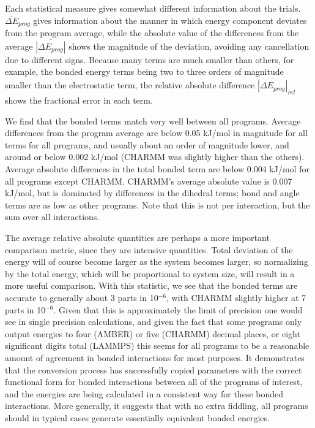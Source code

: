 Each statistical measure gives somewhat different information about
the trials. $\overline{\Delta E}_{prog}$ gives information about the manner
in which energy component deviates from the program average, while the
absolute value of the differences from the average $\overline{\left|\Delta E_{prog}\right|}$ 
shows the magnitude of the deviation, avoiding any
cancellation due to different signs.  Because many terms are much
smaller than others, for example, the bonded energy terms being two to
three orders of magnitude smaller than the electrostatic term, the
relative absolute difference $\overline{\left|\Delta E_{prog}\right|}_{rel}$ shows the fractional error in each term.

We find that the bonded terms match very well between all
programs. Average differences from the program average are below 0.05
kJ/mol in magnitude for all terms for all programs, and usually about
an order of magnitude lower, and around or below 0.002 kJ/mol (CHARMM
was slightly higher than the others). Average absolute differences in
the total bonded term are below 0.004 kJ/mol for all programs except
CHARMM. CHARMM's average absolute value is 0.007 kJ/mol, but is
dominated by differences in the dihedral terms; bond and angle terms
are as low as other programs.  Note that this is not per interaction,
but the sum over all interactions.

The average relative absolute quantities are perhaps a more important
comparison metric, since they are intensive quantities.  Total
deviation of the energy will of course become larger as the system
becomes larger, so normalizing by the total energy, which will be
proportional to system size, will result in a more useful comparison.
With this statistic, we see that the bonded terms are accurate to
generally about 3 parts in 10$^{-6}$, with CHARMM slightly higher at 7
parts in 10$^{-6}$. Given that this is approximately the limit of
precision one would see in single precision calculations, and given
the fact that some programs only output energies to four (AMBER) or
five (CHARMM) decimal places, or eight significant digits total
(LAMMPS) this seems for all programs to be a reasonable amount of
agreement in bonded interactions for most purposes. It demonstrates
that the conversion process has successfully copied parameters with
the correct functional form for bonded interactions between all of the
programs of interest, and the energies are being calculated in a
consistent way for these bonded interactions.  More generally, it
suggests that with no extra fiddling, all programs should in typical
cases generate essentially equivalent bonded energies.

